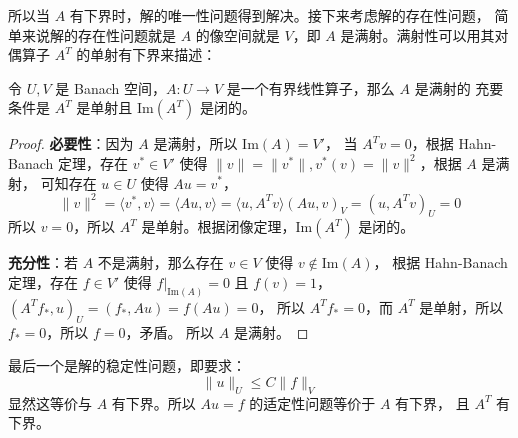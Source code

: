 \documentclass[lang=cn,a4paper,newtx]{elegantpaper}
\begin{document}
所以当 $A$ 有下界时，解的唯一性问题得到解决。接下来考虑解的存在性问题，
简单来说解的存在性问题就是 $A$ 的像空间就是 $V$，即 $A$
是满射。满射性可以用其对偶算子 $A^T$ 的单射有下界来描述：
\begin{theorem}
    \label{thm:surjection}
    令 $U, V$ 是 Banach 空间，$A: U \to V$ 是一个有界线性算子，那么 $A$ 是满射的
    充要条件是 $A^T$ 是单射且 $\mathrm{Im}(A^T)$ 是闭的。
\end{theorem}
\begin{proof}
    \textbf{必要性}：因为 $A$ 是满射，所以 $\mathrm{Im}(A) = V'$，
    当 $A^T v = 0$，根据 Hahn-Banach 定理，存在
    $v^* \in V'$ 使得 $\|v\| = \|v^*\|, v^*(v) = \|v\|^2$，根据 $A$ 是满射，
    可知存在 $u \in U$ 使得 $Au = v^*$，
    $$
    \|v\|^2 = \langle v^*,  v\rangle = \langle Au,  v\rangle 
    = \langle u,  A^Tv\rangle
    (Au,  v)_V = (u,  A^Tv)_U = 0
    $$
    所以 $v = 0$，所以 $A^T$ 是单射。根据闭像定理，$\mathrm{Im}(A^T)$ 是闭的。

    \textbf{充分性}：若 $A$ 不是满射，那么存在 $v \in V$ 使得 $v \notin \mathrm{Im}(A)$，
    根据 Hahn-Banach 定理，存在 $f\in V'$ 使得 $f|_{\mathrm{Im}(A)} = 0$ 且 $f(v) = 1$，
    $(A^T f_*, u)_U = (f_*, Au) = f(Au) = 0$，
    所以 $A^T f_* = 0$，而 $A^T$ 是单射，所以 $f_* = 0$，所以 $f = 0$，矛盾。
    所以 $A$ 是满射。
\end{proof}

最后一个是解的稳定性问题，即要求：
$$
\|u\|_U \leq C\|f\|_V
$$
显然这等价与 $A$ 有下界。所以 $Au = f$ 的适定性问题等价于 $A$ 有下界，
且 $A^T$ 有下界。
\end{document}
